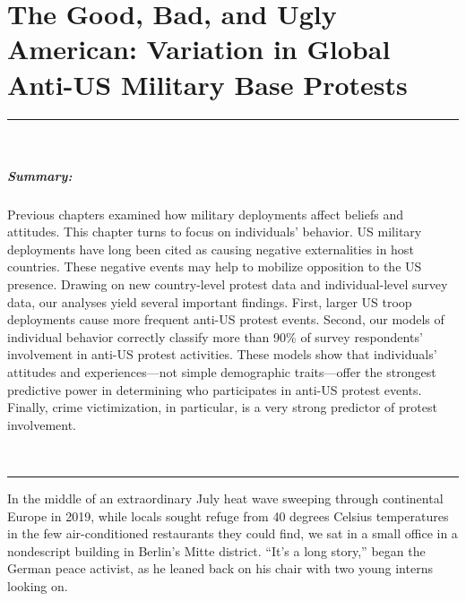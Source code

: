 \chapter{The Good, Bad, and Ugly American: Variation in Global Anti-US Military Base Protests \label{cha:protest}}

\doublespacing




\vspace*{-0.5cm}
\rule{\linewidth}{0.10pt} \\[-1cm]
{\footnotesize\paragraph{Summary:}  Previous chapters examined how military deployments affect beliefs and attitudes. This chapter turns to focus on individuals' behavior. US military deployments have long been cited as causing negative externalities in host countries. These negative events may help to mobilize opposition to the US presence. Drawing on new country-level protest data and individual-level survey data, our analyses yield several important findings. First, larger US troop deployments cause more frequent anti-US protest events. Second, our models of individual behavior correctly classify more than 90\% of survey respondents' involvement in anti-US protest activities. These models show that individuals' attitudes and experiences---not simple demographic traits---offer the strongest predictive power in determining who participates in anti-US protest events. Finally, crime victimization, in particular, is a very strong predictor of protest involvement.} 
\\[-0.5cm] 
\rule{\linewidth}{0.10pt}

\vspace*{0.5cm}

In the middle of an extraordinary July heat wave sweeping through continental Europe in 2019, while locals sought refuge from 40 degrees Celsius temperatures in the few air-conditioned restaurants they could find, we sat in a small office in a nondescript building in Berlin's Mitte district. ``It's a long story,'' began the German peace activist, as he leaned back on his chair with two young interns looking on. 

